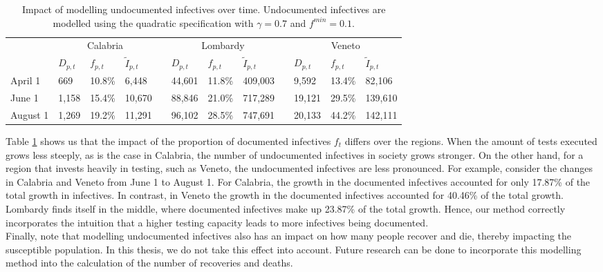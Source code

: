 \documentclass[12pt]{article}
\begin{document}
	\begin{table}[H]
		\centering
		\caption{Impact of modelling undocumented infectives over time. Undocumented infectives are modelled using the quadratic specification with $\gamma = 0.7$ and $f^{min}=0.1$.}
		\label{tab:f_t_over_time}
		\begin{tabular}{llllllllllll}
		    \toprule 
                     & \multicolumn{3}{c}{Calabria} && \multicolumn{3}{c}{Lombardy} && \multicolumn{3}{c}{Veneto} \\
                     \cmidrule{2-4}\cmidrule{6-8}\cmidrule{10-12}
                     & $D_{p,t}$  & $f_{p,t}$   & $\tilde{I}_{p,t}$   && $D_{p,t}$  & $f_{p,t}$   & $\tilde{I}_{p,t}$    && $D_{p,t}$  & $f_{p,t}$  & $\tilde{I}_{p,t}$   \\ \midrule
            April 1  & 669     & 10.8\%  & 6,448   && 44,601  & 11.8\%  & 409,003  && 9,592   & 13.4\% & 82,106  \\
            June 1   & 1,158   & 15.4\%  & 10,670  && 88,846  & 21.0\%  & 717,289  && 19,121  & 29.5\% & 139,610 \\
            August 1 & 1,269   & 19.2\%  & 11,291  && 96,102  & 28.5\%  & 747,691  && 20,133  & 44.2\% & 142,111 \\ \bottomrule
        \end{tabular}
	\end{table}
	
	Table \ref{tab:f_t_over_time} shows us that the impact of the proportion of documented infectives $f_t$ differs over the regions. When the amount of tests executed grows less steeply, as is the case in Calabria, the number of undocumented infectives in society grows stronger. On the other hand, for a region that invests heavily in testing, such as Veneto, the undocumented infectives are less pronounced. For example, consider the changes in Calabria and Veneto from June 1 to August 1. For Calabria, the growth in the documented infectives accounted for only 17.87\% of the total growth in infectives. In contrast, in Veneto the growth in the documented infectives accounted for 40.46\% of the total growth. Lombardy finds itself in the middle, where documented infectives make up 23.87\% of the total growth. Hence, our method correctly incorporates the intuition that a higher testing capacity leads to more infectives being documented. \\
	
	Finally, note that modelling undocumented infectives also has an impact on how many people recover and die, thereby impacting the susceptible population. In this thesis, we do not take this effect into account. Future research can be done to incorporate this modelling method into the calculation of the number of recoveries and deaths.
	
\end{document}
